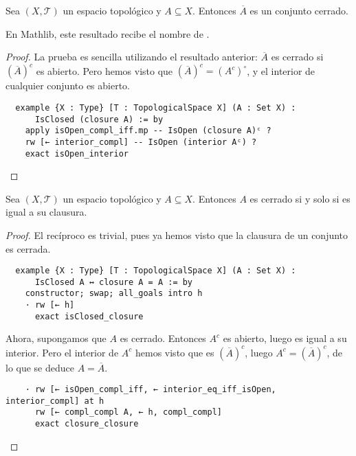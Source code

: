 \begin{proposition}
  Sea $(X, \mathcal{T})$ un espacio topológico y $A \subseteq X$. Entonces $\overline{A}$ es un conjunto cerrado.
\end{proposition}

En Mathlib, este resultado recibe el nombre de .

\begin{proof}
  La prueba es sencilla utilizando el resultado anterior: $\overline{A}$ es cerrado si $(\overline{A})^c$ es abierto. Pero hemos visto que $(\overline{A})^c = (A^c)^\circ$, y el interior de cualquier conjunto es abierto.

  \begin{lstlisting}
  example {X : Type} [T : TopologicalSpace X] (A : Set X) :
      IsClosed (closure A) := by
    apply isOpen_compl_iff.mp -- IsOpen (closure A)ᶜ ?
    rw [← interior_compl] -- IsOpen (interior Aᶜ) ?
    exact isOpen_interior \end{lstlisting}
\end{proof}

\begin{proposition}
  Sea $(X, \mathcal{T})$ un espacio topológico y $A \subseteq X$. Entonces $A$ es cerrado si y solo si es igual a su clausura.
\end{proposition}

\begin{proof}
  El recíproco es trivial, pues ya hemos visto que la clausura de un conjunto es cerrada.

  \begin{lstlisting}
  example {X : Type} [T : TopologicalSpace X] (A : Set X) :
      IsClosed A ↔ closure A = A := by
    constructor; swap; all_goals intro h
    · rw [← h]
      exact isClosed_closure \end{lstlisting}

  Ahora, supongamos que $A$ es cerrado. Entonces $A^c$ es abierto, luego es igual a su interior. Pero el interior de $A^c$ hemos visto que es $(\overline{A})^c$, luego $A^c = (\overline{A})^c$, de lo que se deduce $A = \overline{A}$.

  \begin{lstlisting}
    · rw [← isOpen_compl_iff, ← interior_eq_iff_isOpen, interior_compl] at h
      rw [← compl_compl A, ← h, compl_compl]
      exact closure_closure \end{lstlisting}
  
\end{proof}


